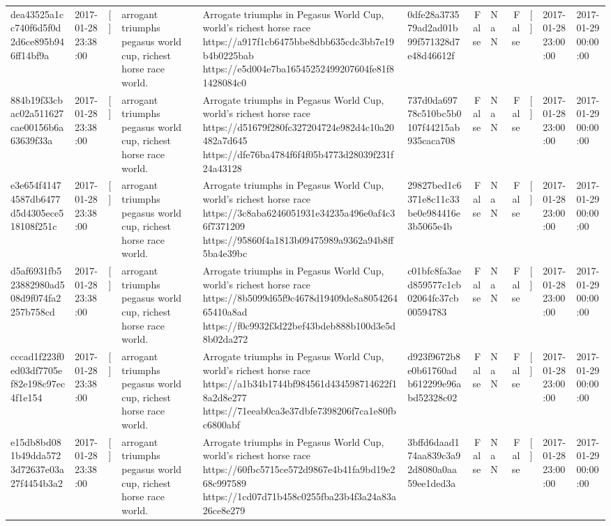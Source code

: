 \begin{tabular}{llllllrlrlll}
dea43525a1cc740f6d5f0d2d6ce895b946ff14bf9a & 2017-01-28 23:38:00 & [] & arrogant triumphs pegasus world cup, richest horse race world. & Arrogate triumphs in Pegasus World Cup, world's richest horse race https://a917f1cb6475bbe8dbb635cdc3bb7e19b4b0225bab https://e5d004e7ba16545252499207604fe81f81428084c0 & 0dfe28a373579ad2ad01b99f571328d7e48d46612f & False & NaN & False & [] & 2017-01-28 23:00:00 & 2017-01-29 00:00:00 \\
884b19f33cbac02a511627cae00156b6a63639f33a & 2017-01-28 23:38:00 & [] & arrogant triumphs pegasus world cup, richest horse race world. & Arrogate triumphs in Pegasus World Cup, world's richest horse race https://d51679f280fc327204724e982d4c10a20482a7d645 https://dfe76ba4784f6f4f05b4773d28039f231f24a43128 & 737d0da69778c510bc5b0107f44215ab935caca708 & False & NaN & False & [] & 2017-01-28 23:00:00 & 2017-01-29 00:00:00 \\
e3e654f41474587db6477d5d4305ece518108f251c & 2017-01-28 23:38:00 & [] & arrogant triumphs pegasus world cup, richest horse race world. & Arrogate triumphs in Pegasus World Cup, world's richest horse race https://3c8aba6246051931e34235a496e0af4c36f7371209 https://95860f4a1813b09475989a9362a94b8ff5ba4e39bc & 29827bed1c6371e8c11c33be0e984416e3b5065e4b & False & NaN & False & [] & 2017-01-28 23:00:00 & 2017-01-29 00:00:00 \\
d5af6931fb523882980ad508d9f074fa2257b758cd & 2017-01-28 23:38:00 & [] & arrogant triumphs pegasus world cup, richest horse race world. & Arrogate triumphs in Pegasus World Cup, world's richest horse race https://8b5099d65f9c4678d19409de8a805426465410a8ad https://f0c9932f3d22bef43bdeb888b100d3e5d8b02da272 & c01bfc8fa3aed859577c1cb02064fc37cb00594783 & False & NaN & False & [] & 2017-01-28 23:00:00 & 2017-01-29 00:00:00 \\
cccad1f223f0ed03df7705ef82e198c97ec4f1e154 & 2017-01-28 23:38:00 & [] & arrogant triumphs pegasus world cup, richest horse race world. & Arrogate triumphs in Pegasus World Cup, world's richest horse race https://a1b34b1744bf984561d434598714622f18a2d8e277 https://71eeab0ca3e37dbfe7398206f7ca1e80fbc6800abf & d923f9672b8e0b61760adb612299e96abd52328c02 & False & NaN & False & [] & 2017-01-28 23:00:00 & 2017-01-29 00:00:00 \\
e15db8bd081b49dda5723d72637e03a27f4454b3a2 & 2017-01-28 23:38:00 & [] & arrogant triumphs pegasus world cup, richest horse race world. & Arrogate triumphs in Pegasus World Cup, world's richest horse race https://60fbc5715ce572d9867e4b41fa9bd19e268c997589 https://1cd07d71b458c0255fba23b4f3a24a83a26ce8e279 & 3bffd6daad174aa839c3a92d8080a0aa59ee1ded3a & False & NaN & False & [] & 2017-01-28 23:00:00 & 2017-01-29 00:00:00 \\

\end{tabular}
